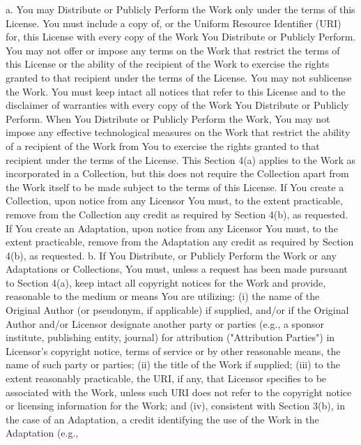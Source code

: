  a. You may Distribute or Publicly Perform the Work only under the terms
    of this License. You must include a copy of, or the Uniform Resource
    Identifier (URI) for, this License with every copy of the Work You
    Distribute or Publicly Perform. You may not offer or impose any terms
    on the Work that restrict the terms of this License or the ability of
    the recipient of the Work to exercise the rights granted to that
    recipient under the terms of the License. You may not sublicense the
    Work. You must keep intact all notices that refer to this License and
    to the disclaimer of warranties with every copy of the Work You
    Distribute or Publicly Perform. When You Distribute or Publicly
    Perform the Work, You may not impose any effective technological
    measures on the Work that restrict the ability of a recipient of the
    Work from You to exercise the rights granted to that recipient under
    the terms of the License. This Section 4(a) applies to the Work as
    incorporated in a Collection, but this does not require the Collection
    apart from the Work itself to be made subject to the terms of this
    License. If You create a Collection, upon notice from any Licensor You
    must, to the extent practicable, remove from the Collection any credit
    as required by Section 4(b), as requested. If You create an
    Adaptation, upon notice from any Licensor You must, to the extent
    practicable, remove from the Adaptation any credit as required by
    Section 4(b), as requested.
 b. If You Distribute, or Publicly Perform the Work or any Adaptations or
    Collections, You must, unless a request has been made pursuant to
    Section 4(a), keep intact all copyright notices for the Work and
    provide, reasonable to the medium or means You are utilizing: (i) the
    name of the Original Author (or pseudonym, if applicable) if supplied,
    and/or if the Original Author and/or Licensor designate another party
    or parties (e.g., a sponsor institute, publishing entity, journal) for
    attribution ("Attribution Parties") in Licensor's copyright notice,
    terms of service or by other reasonable means, the name of such party
    or parties; (ii) the title of the Work if supplied; (iii) to the
    extent reasonably practicable, the URI, if any, that Licensor
    specifies to be associated with the Work, unless such URI does not
    refer to the copyright notice or licensing information for the Work;
    and (iv), consistent with Section 3(b), in the case of an Adaptation,
    a credit identifying the use of the Work in the Adaptation (e.g.,
